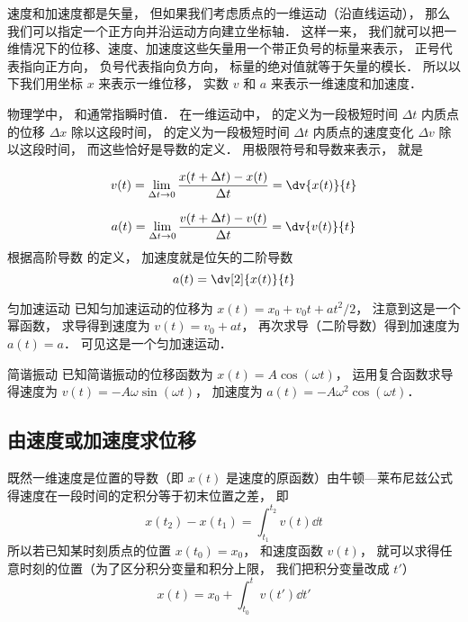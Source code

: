 

速度和加速度都是矢量， 但如果我们考虑质点的一维运动（沿直线运动）， 那么我们可以指定一个正方向并沿运动方向建立坐标轴． 这样一来， 我们就可以把一维情况下的位移、速度、加速度这些矢量用一个带正负号的标量来表示， 正号代表指向正方向， 负号代表指向负方向， 标量的绝对值就等于矢量的模长． 所以以下我们用坐标 $x$ 来表示一维位移， 实数 $v$ 和 $a$ 来表示一维速度和加速度．

物理学中， 和通常指瞬时值． 在一维运动中， 的定义为一段极短时间 $\Delta t$ 内质点的位移 $\Delta x$ 除以这段时间， 的定义为一段极短时间 $\Delta t$ 内质点的速度变化 $\Delta v$ 除以这段时间， 而这些恰好是导数的定义． 用极限符号和导数来表示， 就是

\begin{equation}
v(t) = \lim_{\Delta t\to 0} \frac{x(t+\Delta t) - x(t)}{\Delta t} = \dv{x(t)}{t}
\end{equation}

\begin{equation}
a(t) = \lim_{\Delta t\to 0} \frac{v(t+\Delta t) - v(t)}{\Delta t} = \dv{v(t)}{t}
\end{equation}
根据高阶导数%
的定义， 加速度就是位矢的二阶导数
\begin{equation}
a(t) = \dv[2]{x(t)}{t}
\end{equation}

\begin{exam}{匀加速运动}
已知匀加速运动的位移为 $x(t) = x_0 + v_0 t + a t^2/2$， 注意到这是一个幂函数， 求导得到速度为 $v(t) = v_0 + a t$， 再次求导（二阶导数）得到加速度为 $a(t) = a$． 可见这是一个匀加速运动．
\end{exam}

\begin{exam}{简谐振动}
已知简谐振动的位移函数为 $x(t) = A\cos(\omega t)$， 运用复合函数求导%
得速度为 $v(t) = -A\omega\sin(\omega t)$， 加速度为 $a(t) = -A\omega^2\cos(\omega t)$．
\end{exam}


\subsection{由速度或加速度求位移}
既然一维速度是位置的导数（即 $x(t)$ 是速度的原函数）由牛顿—莱布尼兹公式得速度在一段时间的定积分等于初末位置之差， 即
\begin{equation}\label{VnA1_eq4}
x(t_2) - x(t_1) = \int_{t_1}^{t_2} v(t) \dd{t}
\end{equation}
所以若已知某时刻质点的位置 $x(t_0) = x_0$， 和速度函数 $v(t)$， 就可以求得任意时刻的位置（为了区分积分变量和积分上限， 我们把积分变量改成 $t'$）
\begin{equation}\label{VnA1_eq5}
x(t) = x_0 + \int_{t_0}^t v(t') \dd{t'}
\end{equation}

